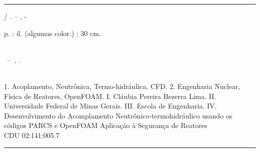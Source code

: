 \documentclass[12pt,openright,twoside,a4paper,english,french,spanish,brazil]{abntex2}
\begin{document}
\frenchspacing 

\pretextual

\imprimircapa

\imprimirfolhaderosto*


%
%     
\begin{fichacatalografica}
	\vspace*{\fill}					%
	\hrule							%
	\begin{center}					%
	\begin{minipage}[c]{12.5cm}		%
	
	\imprimirautor
	
	\hspace{0.5cm} \imprimirtitulo  / \imprimirautor. --
	\imprimirlocal, \imprimirdata-
	
	\hspace{0.5cm} \pageref{LastPage} p. : il. (algumas color.) ; 30 cm.\\
	
	\hspace{0.5cm} \imprimirorientadorRotulo~\imprimirorientador\\
	
	\hspace{0.5cm}
	\parbox[t]{\textwidth}{\imprimirtipotrabalho~--~\imprimirinstituicao,
	\imprimirdata.}\\
	
	\hspace{0.5cm}
		1. Acoplamento, Neutrônica, Termo-hidráulica, CFD.
		2. Engenharia Nuclear, Física de Reatores, OpenFOAM.
		I. Cláubia Pereira Bezerra Lima.
		II. Universidade Federal de Minas Gerais.
		III. Escola de Engenharia.
		IV. Desenvolvimento do Acomplamento Neutrônico-termohidráulico 
                usando os códigos PARCS e OpenFOAM Aplicação à Segurança de Reatores\\ 			
	
	\hspace{8.75cm} CDU 02:141:005.7\\
	
	\end{minipage}
	\end{center}
	\hrule
\end{fichacatalografica}
\end{document}
